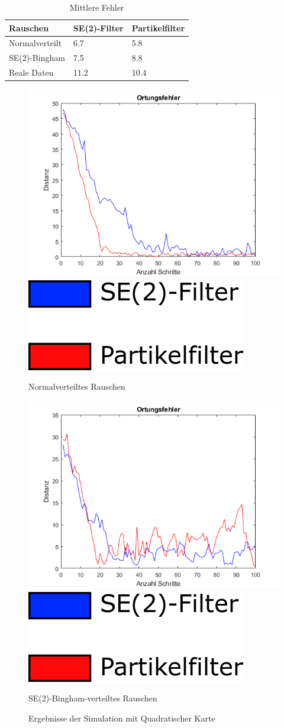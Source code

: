 \begin{table}[h!]
	\centering
	\caption{Mittlere Fehler}
	\label{tab:ergebnisse}
	\begin{tabular}{lll}
		\toprule
		Rauschen &  SE(2)-Filter &  Partikelfilter\\
		\midrule
		Normalverteilt 	& 6.7       & 5.8\\
		SE(2)-Bingham 	& 7.5		&  8.8\\
		Reale Daten 	& 11.2		& 10.4\\
		\bottomrule
	\end{tabular}
\end{table}

\begin{figure}[h!]
	\centering
	\includegraphics[width=0.7\linewidth]{Images/gaussianBox.png}
	\includegraphics[width =0.1\linewidth]{Images/Legende.png}
	\caption{Normalverteiltes Rauschen}
    \label{fig:gaussian}
    
	\includegraphics[width=0.7\linewidth]{Images/se2Box.png}
	\includegraphics[width =0.1\linewidth]{Images/Legende.png}
	\caption{SE(2)-Bingham-verteiltes Rauschen}
	\label{fig:se2}
	\caption{Ergebnisse der Simulation mit Quadratischer Karte}
\end{figure}

